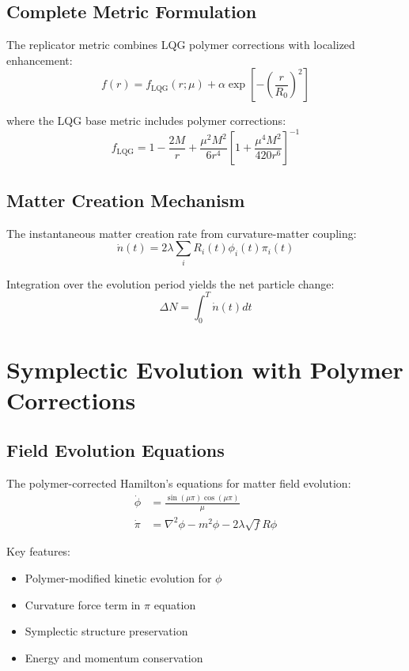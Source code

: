 \documentclass[11pt]{article}
\begin{document}
\subsection{Complete Metric Formulation}

The replicator metric combines LQG polymer corrections with localized enhancement:
\begin{equation}
f(r) = f_{\text{LQG}}(r;\mu) + \alpha \exp\left[-\left(\frac{r}{R_0}\right)^2\right]
\end{equation}

where the LQG base metric includes polymer corrections:
\begin{equation}
f_{\text{LQG}} = 1 - \frac{2M}{r} + \frac{\mu^2 M^2}{6r^4}\left[1 + \frac{\mu^4 M^2}{420r^6}\right]^{-1}
\end{equation}

\subsection{Matter Creation Mechanism}

The instantaneous matter creation rate from curvature-matter coupling:
\begin{equation}
\dot{n}(t) = 2\lambda \sum_i R_i(t) \phi_i(t) \pi_i(t)
\end{equation}

Integration over the evolution period yields the net particle change:
\begin{equation}
\Delta N = \int_0^T \dot{n}(t) dt
\end{equation}

\section{Symplectic Evolution with Polymer Corrections}

\subsection{Field Evolution Equations}

The polymer-corrected Hamilton's equations for matter field evolution:
\begin{align}
\dot{\phi} &= \frac{\sin(\mu\pi)\cos(\mu\pi)}{\mu} \\
\dot{\pi} &= \nabla^2\phi - m^2\phi - 2\lambda\sqrt{f}R\phi
\end{align}

Key features:
\begin{itemize}
\item Polymer-modified kinetic evolution for $\phi$
\item Curvature force term in $\pi$ equation
\item Symplectic structure preservation
\item Energy and momentum conservation
\end{itemize}
\end{document}
